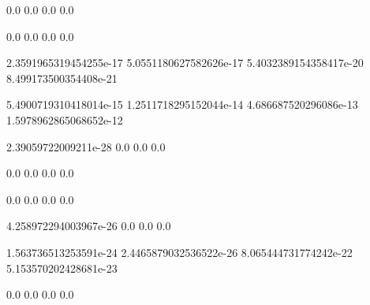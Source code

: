 
0.0
0.0
0.0
0.0


0.0
0.0
0.0
0.0


2.3591965319454255e-17
5.0551180627582626e-17
5.4032389154358417e-20
8.499173500354408e-21


5.4900719310418014e-15
1.2511718295152044e-14
4.686687520296086e-13
1.5978962865068652e-12


2.39059722009211e-28
0.0
0.0
0.0


0.0
0.0
0.0
0.0


0.0
0.0
0.0
0.0


4.258972294003967e-26
0.0
0.0
0.0


1.563736513253591e-24
2.4465879032536522e-26
8.065444731774242e-22
5.153570202428681e-23


0.0
0.0
0.0
0.0
